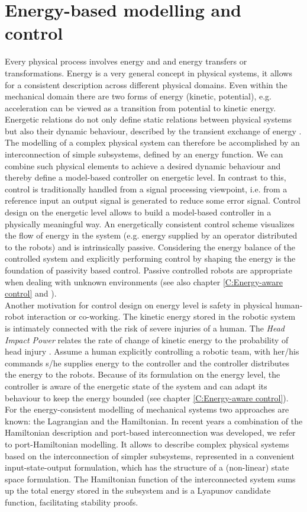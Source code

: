\documentclass[a4paper,twoside, openright,12pt]{report}
\begin{document}
\section{Energy-based modelling and control}
Every physical process involves energy and and energy transfers or transformations. Energy is a very general concept in physical systems, it allows for a consistent description across different physical domains. Even within the mechanical domain there are two forms of energy (kinetic, potential), e.g. acceleration can be viewed as a transition from potential to kinetic energy. Energetic relations do not only define static relations between physical systems but also their dynamic behaviour, described by the transient exchange of energy \cite{Ortega_01}. The modelling of a complex physical system can therefore be accomplished by an interconnection of simple subsystems, defined by an energy function. We can combine such physical elements to achieve a desired dynamic behaviour and thereby define a model-based controller on energetic level.  In contrast to this, control is traditionally handled from a signal processing viewpoint, i.e. from a reference input an output signal is generated to reduce some error signal. Control design on the energetic level allows to build a model-based controller in a physically meaningful way. An energetically consistent control scheme visualizes the flow of energy in the system (e.g. energy supplied by an operator distributed to the robots) and is intrinsically passive. Considering the energy balance of the controlled system and explicitly performing control by shaping the energy is the foundation of passivity based control. Passive controlled robots are appropriate when dealing with unknown environments (see also chapter \ref{C:Energy-aware control} and \cite{Stramigioli_15}).\\
Another motivation for control design on energy level is safety in physical human-robot interaction or co-working. The kinetic energy stored in the robotic system is intimately connected with the risk of severe injuries of a human. The \emph{Head Impact Power} relates the rate of change of kinetic energy to the probability of head injury \cite{Newman_00}. Assume a human explicitly controlling a robotic team, with her/his commands s/he supplies energy to the controller and the controller distributes the energy to the robots. Because of its formulation on the energy level, the controller is aware of the energetic state of the system and can adapt its behaviour to keep the energy bounded (see chapter \ref{C:Energy-aware control}).\\
For the energy-consistent modelling of mechanical systems two approaches are known:  the Lagrangian and the Hamiltonian. In recent years a combination of the Hamiltonian description and port-based interconnection was developed, we refer to port-Hamiltonian modelling. It allows to describe complex physical systems based on the interconnection of simpler subsystems, represented in a convenient input-state-output formulation, which has the structure of a (non-linear) state space formulation. The Hamiltonian function of the interconnected system sums up the total energy stored in the subsystem and is a Lyapunov candidate function, facilitating stability proofs.
\end{document}
